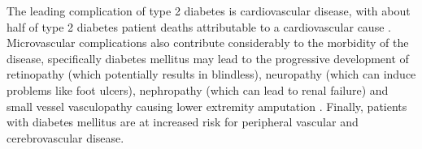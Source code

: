 The leading complication of type 2 diabetes is cardiovascular disease, with about half of type 2 diabetes patient deaths attributable to a cardiovascular cause \citep{beulens2010global}. Microvascular complications also contribute considerably to the morbidity of the disease, specifically diabetes mellitus may lead to the progressive development of retinopathy (which potentially results in blindless), neuropathy (which can induce problems like foot ulcers), nephropathy (which can lead to renal failure) \citep{atkins2010diabetic} and small vessel vasculopathy causing lower extremity amputation \citep{beulens2010global}. Finally, patients with diabetes mellitus are at increased risk for peripheral vascular and cerebrovascular disease. 





